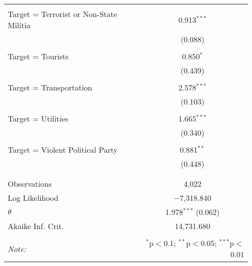 \begin{table}[!htbp]
\begin{tabular}{@{\extracolsep{5pt}}lc}
  & \\ 
 Target = Terrorist or Non-State Militia & 0.913$^{***}$ \\ 
  & (0.088) \\ 
  & \\ 
 Target = Tourists & 0.850$^{*}$ \\ 
  & (0.439) \\ 
  & \\ 
 Target = Transportation & 2.578$^{***}$ \\ 
  & (0.103) \\ 
  & \\ 
 Target = Utilities & 1.665$^{***}$ \\ 
  & (0.340) \\ 
  & \\ 
 Target = Violent Political Party & 0.881$^{**}$ \\ 
  & (0.448) \\ 
  & \\ 
\hline \\[-1.8ex] 
Observations & 4,022 \\ 
Log Likelihood & $-$7,318.840 \\ 
$\theta$ & 1.978$^{***}$  (0.062) \\ 
Akaike Inf. Crit. & 14,731.680 \\ 
\hline 
\hline \\[-1.8ex] 
\textit{Note:}  & \multicolumn{1}{r}{$^{*}$p$<$0.1; $^{**}$p$<$0.05; $^{***}$p$<$0.01} \\ 
\end{tabular} 
\end{table} 
